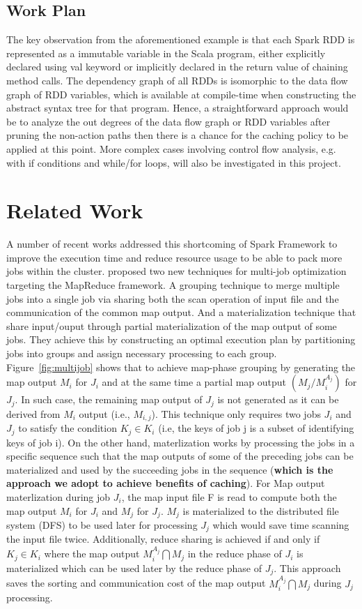 \documentclass[conference]{sig-alternate-05-2015}
\begin{document}
\subsection{Work Plan}
The key observation from the aforementioned example is that each Spark RDD is represented as a immutable variable in the Scala program, either explicitly declared using val keyword or implicitly declared in the return value of chaining method calls. The dependency graph of all RDDs is isomorphic to the data flow graph of RDD variables, which is available at compile-time when constructing the abstract syntax tree for that program. Hence, a straightforward approach would be to analyze the out degrees of the data flow graph or RDD variables after pruning the non-action paths then there is a chance for the caching policy to be applied at this point. More complex cases involving control flow analysis, e.g. with if conditions and while/for loops, will also be investigated in this project.

\section{Related Work}
A number of recent works addressed this shortcoming of Spark Framework to improve the execution time and reduce resource usage to be able to pack more jobs within the cluster. \cite{Wang:2013du} proposed two new techniques for multi-job optimization targeting the MapReduce framework. A grouping technique to merge multiple jobs into a single job via sharing both the scan operation of input file and the communication of the common map output. And a materialization technique that share input/ouput through partial materialization of the map output of some jobs. They achieve this by constructing an optimal execution plan by partitioning jobs into groups and assign necessary processing to each group. Figure~\ref{fig:multijob} shows that to achieve map-phase grouping by generating the map output $M_i$ for $J_i$ and at the same time a partial map output $(M_j/M_i^{A_j})$ for $J_j$. In such case, the remaining map output of $J_j$ is not generated as it can be derived from $M_i$ output (i.e., $M_{i,j}$). This technique only  requires two jobs $J_i$ and $J_j$ to satisfy the condition $K_j \in K_i$ (i.e, the keys of job j is a subset of identifying keys of job i). On the other hand, materlization works by processing the jobs in a specific sequence such that the map outputs of some of the preceding jobs can be materialized and used by the succeeding jobs in the sequence (\textbf{which is the approach we adopt to achieve benefits of caching}). For Map output materlization during job $J_i$, the map input file F is read to compute both the map output $M_i$ for $J_i$ and $M_j$ for $J_j$. $M_j$ is materialized to the distributed file system (DFS) to be used later for processing $J_j$ which would save time scanning the input file twice. Additionally, reduce sharing is achieved if and only if $K_j \in K_i$ where the map output $M_i^{A_j} \bigcap M_j$ in the reduce phase of $J_i$ is materialized which can be used later by the reduce phase of $J_j$. This approach saves the sorting and communication cost of the map output $M_i^{A_j} \bigcap M_j$ during $J_j$ processing.
\end{document}
